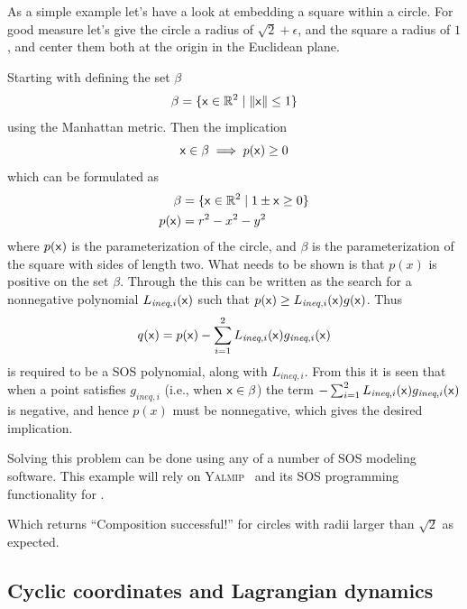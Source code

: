 \begin{example}

  As a simple example let's have a look at embedding a square within a circle.
  For good measure let's give the circle a radius of \(\sqrt{2}+\epsilon\), and
  the square a radius of \(1\), and center them both at the origin in the
  Euclidean plane.

  Starting with defining the set \(\beta\)
  \[
    \beta = \lbrace{\mathbf{\mathsf{x}}} \in \mathbb{R}^2 \mid \lVert{\mathbf{\mathsf{x}}}\rVert \leq 1\rbrace
  \]
  using the Manhattan metric. Then the implication
  \[
    {\mathbf{\mathsf{x}}} \in \beta \implies p({\mathbf{\mathsf{x}}}) \geq 0
  \]
  which can be formulated as
  \begin{align*}
    \beta &= \lbrace{\mathbf{\mathsf{x}}} \in \mathbb{R}^2 \mid 1 \pm {\mathbf{\mathsf{x}}} \geq 0 \rbrace \\
    p({\mathbf{\mathsf{x}}}) &= r^2 - x^2 - y^2
  \end{align*}
  where \(p({\mathbf{\mathsf{x}}})\) is the parameterization of the circle, and \(\beta\) is
  the parameterization of the square with sides of length two. What needs to be
  shown is that \(p(x)\) is positive on the set \(\beta\). Through the
   this can be written as the search for a nonnegative
  polynomial \(L_{\textit{ineq},i}({\mathbf{\mathsf{x}}})\) such that \(p({\mathbf{\mathsf{x}}}) \geq
  L_{\textit{ineq},i}({\mathbf{\mathsf{x}}})g({\mathbf{\mathsf{x}}}) \). Thus
  \[
    q({\mathbf{\mathsf{x}}}) = p({\mathbf{\mathsf{x}}}) -
    \sum_{i=1}^{2}L_{\textit{ineq},i}({\mathbf{\mathsf{x}}})g_{\textit{ineq},i}({\mathbf{\mathsf{x}}})
  \]
  is required to be a \ac{SOS} polynomial, along with \(L_{\textit{ineq},i}\). From this
  it is seen that when a point satisfies \(g_{\textit{ineq},i}\) (i.e., when \({\mathbf{\mathsf{x}}} \in
  \beta\)) the term \( - \sum_{i=1}^{2}L_{\textit{ineq},i}({\mathbf{\mathsf{x}}})g_{\textit{ineq},i}({\mathbf{\mathsf{x}}})\)
  is negative, and hence \(p(x)\) must be nonnegative, which gives the desired
  implication.

  Solving this problem can be done using any of a number of \ac{SOS} modeling
  software. This example will rely on \textsc{Yalmip}~\cite{Lofberg2004} and its
  \ac{SOS} programming functionality \cite{Lofberg2009} for \matlab.


  

  Which returns ``Composition successful!'' for circles with radii larger than
  \(\sqrt{2}\) as expected.
\end{example}

\subsection{Cyclic coordinates and Lagrangian dynamics}
\label{subsec:cyclic-coordinates}

